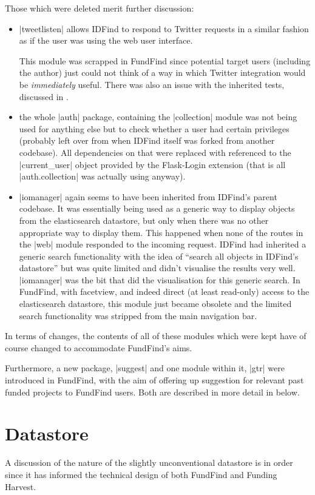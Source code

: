 Those which were deleted merit further discussion:
\begin{itemize}
	\item |tweetlisten| allows IDFind to respond to Twitter requests in a similar fashion as if the user was using the web user interface.
	
	This module was scrapped in FundFind since potential target users (including the author) just could not think of a way in which Twitter integration would be \emph{immediately} useful. There was also an issue with the inherited tests, discussed in .
	\item the whole |auth| package, containing the |collection| module was not being used for anything else but to check whether a user had certain privileges (probably left over from when IDFind itself was forked from another codebase). All dependencies on that were replaced with referenced to the |current_user| object provided by the Flask-Login extension (that is all |auth.collection| was actually using anyway).
	\item |iomanager| again seems to have been inherited from IDFind's parent codebase. It was essentially being used as a generic way to display objects from the elasticsearch datastore, but only when there was no other appropriate way to display them. This happened when none of the routes in the |web| module responded to the incoming request. IDFind had inherited a generic search functionality with the idea of ``search all objects in IDFind's datastore'' but was quite limited and didn't visualise the results very well. |iomanager| was the bit that did the visualisation for this generic search. In FundFind, with facetview, and indeed direct (at least read-only) access to the elasticsearch datastore, this module just became obsolete and the limited search functionality was stripped from the main navigation bar.
\end{itemize}

In terms of changes, the contents of all of these modules which were kept have of course changed to accommodate FundFind's aims.

Furthermore, a new package, |suggest| and one module within it, |gtr| were introduced in FundFind, with the aim of offering up suggestion for relevant past funded projects to FundFind users. Both are described in more detail in  below.

\section{Datastore}
\label{design-datastore}
A discussion of the nature of the slightly unconventional datastore is in order since it has informed the technical design of both FundFind and Funding Harvest.


